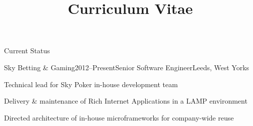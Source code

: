 \documentclass{cv}
\title{Curriculum Vitae}
\begin{document}

\begin{rSection}{Current Status}

\begin{rSubsection}{Sky Betting \& Gaming}{2012--Present}{Senior Software Engineer}{Leeds, West Yorks}
\item Technical lead for Sky Poker in-house development team
\item Delivery \& maintenance of Rich Internet Applications in a LAMP environment
\item Directed architecture of in-house microframeworks for company-wide reuse
\end{rSubsection}

\end{rSection}

\end{document}
